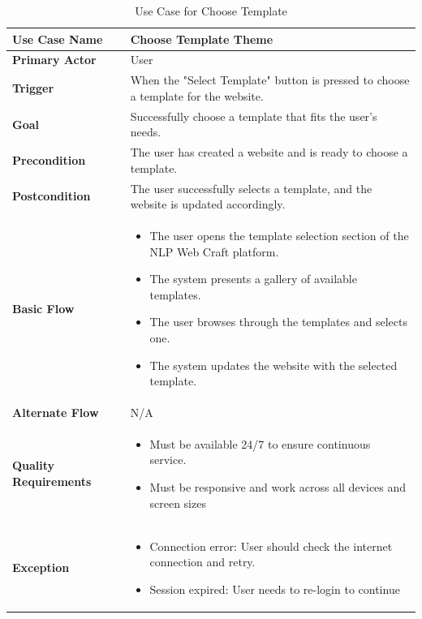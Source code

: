 \documentclass[12pt]{report}
\begin{document}
\begin{table}[h!]

\begin{tabular}{|p{3.5cm}|p{10cm}|}
\hline
\textbf{Use Case Name} & Choose Template Theme \\ 
\hline
\textbf{Primary Actor} & User \\ 
\hline
\textbf{Trigger} & When the "Select Template" button is pressed to choose a template for the website. \\ 
\hline
\textbf{Goal} & Successfully choose a template that fits the user's needs. \\ 
\hline
\textbf{Precondition} & The user has created a website and is ready to choose a template. \\ 
\hline
\textbf{Postcondition} & The user successfully selects a template, and the website is updated accordingly. \\ 

\hline
\textbf{Basic Flow} & 
\begin{itemize}
    \item The user opens the template selection section of the NLP Web Craft platform.
    \item The system presents a gallery of available templates.
    \item The user browses through the templates and selects one.
    \item The system updates the website with the selected template.
\end{itemize} \\ 
\hline
\textbf{Alternate Flow} & N/A \\ 
\hline
\textbf{Quality Requirements} & 
\begin{itemize}
    \item Must be available 24/7 to ensure continuous service.
    \item Must be responsive and work across all devices and screen sizes
\end{itemize} \\ 
\hline
\textbf{Exception} & 
\begin{itemize}
    \item Connection error: User should check the internet connection and retry.
    \item Session expired: User needs to re-login to continue
\end{itemize} \\ 
\hline
\end{tabular}

\caption{Use Case for Choose Template}
\end{table}
\clearpage
\vspace{10pt}
\end{document}

